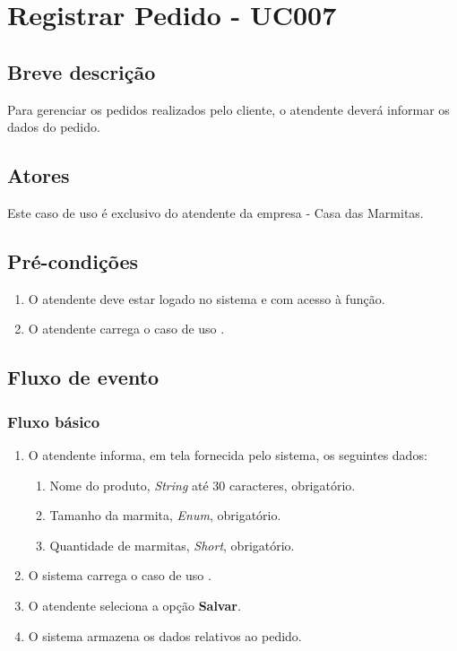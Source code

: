 \chapter{Registrar Pedido - UC007} \label{uc007}

\section{Breve descrição}

Para gerenciar os pedidos realizados pelo cliente, o atendente deverá informar os dados do pedido.

\section{Atores}

Este caso de uso é exclusivo do atendente da empresa - Casa das Marmitas.

\section{Pré-condições}

\begin{enumerate}
	\item O atendente deve estar logado no sistema e com acesso à função.
	\item O atendente carrega o caso de uso .
\end{enumerate}

\section{Fluxo de evento}

\subsection{Fluxo básico}

\begin{enumerate}
	\item O atendente informa, em tela fornecida pelo sistema, os seguintes dados:
	\begin{enumerate}
		\item Nome do produto, \emph{String} até 30 caracteres, obrigatório.
		\item Tamanho da marmita, \emph{Enum}, obrigatório.
		\item Quantidade de marmitas, \emph{Short}, obrigatório.		
	\end{enumerate}
	\item O sistema carrega o caso de uso .
	\item O atendente seleciona a opção \textbf{Salvar}.
	\item O sistema armazena os dados relativos ao pedido.
\end{enumerate}


